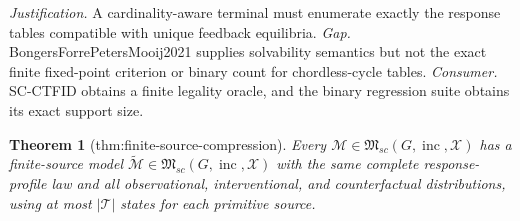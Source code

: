 \documentclass{article}
\newtheorem{theorem}{Theorem}
\begin{document}
\par\smallskip\noindent \textit{Justification.} A cardinality-aware terminal must enumerate exactly the response tables compatible with unique feedback equilibria. \textit{Gap.} BongersForrePetersMooij2021 supplies solvability semantics but not the exact finite fixed-point criterion or binary count for chordless-cycle tables. \textit{Consumer.} SC-CTFID obtains a finite legality oracle, and the binary regression suite obtains its exact support size.

\begin{theorem}[thm:finite-source-compression]\label{thm:finite-source-compression}
Every \(\mathcal M\in\mathfrak M_{sc}(G,\operatorname{inc},\mathcal X)\) has a finite-source model \(\widetilde{\mathcal M}\in\mathfrak M_{sc}(G,\operatorname{inc},\mathcal X)\) with the same complete response-profile law and all observational, interventional, and counterfactual distributions, using at most \(|\mathcal T|\) states for each primitive source.
\end{theorem}
\end{document}
